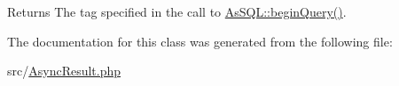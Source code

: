 \begin{DoxyReturn}{Returns}
The tag specified in the call to \hyperlink{classAsSQL_a4768f01dcde0f9ff4205bffd96c0da91}{As\-S\-Q\-L\-::begin\-Query()}. 
\end{DoxyReturn}


The documentation for this class was generated from the following file\-:\begin{DoxyCompactItemize}
\item 
src/\hyperlink{AsyncResult_8php}{Async\-Result.\-php}\end{DoxyCompactItemize}
